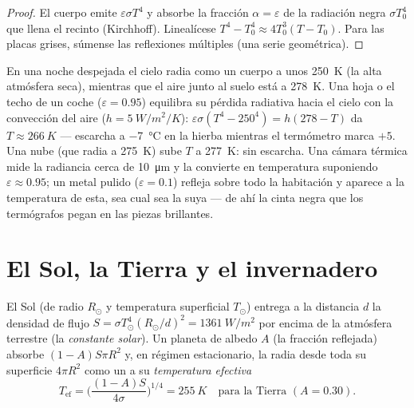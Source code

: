 \begin{proof}
El cuerpo emite $\varepsilon\sigma T^4$ y absorbe la fracción $\alpha =
\varepsilon$ de la radiación negra $\sigma T_0^4$ que llena el recinto
(Kirchhoff). Linealícese $T^4 - T_0^4 \approx 4T_0^3(T - T_0)$. Para las
placas grises, súmense las reflexiones múltiples (una serie geométrica).
\end{proof}

\begin{example}\label{ex:b2:thermal-radiation:frost}
En una noche despejada el cielo radia como un cuerpo a unos \qty{250}{K}
(la alta atmósfera seca), mientras que el aire junto al suelo está a
\qty{278}{K}. Una hoja o el techo de un coche ($\varepsilon = 0.95$) equilibra su
pérdida radiativa hacia el cielo con la convección del aire ($h =
\qty{5}{W/m^2/K}$): $\varepsilon\sigma(T^4 - 250^4) = h(278 - T)$ da $T
\approx \qty{266}{K}$ --- escarcha a \qty{-7}{\celsius} en la hierba mientras
el termómetro marca $+5$. Una nube (que radia a \qty{275}{K}) sube $T$
a \qty{277}{K}: sin escarcha. Una cámara térmica mide la radiancia cerca de
\qty{10}{\micro m} y la convierte en temperatura suponiendo
$\varepsilon \approx 0.95$; un metal pulido ($\varepsilon = 0.1$) refleja
sobre todo la habitación y aparece a la temperatura de esta, sea cual sea la
suya --- de ahí la cinta negra que los termógrafos pegan en las piezas brillantes.
\end{example}

\section{El Sol, la Tierra y el invernadero}

\begin{proposition}\label{prop:b2:thermal-radiation:earth}
El Sol (de radio $R_\odot$ y temperatura superficial $T_\odot$) entrega a la
distancia $d$ la densidad de flujo $S = \sigma T_\odot^4 (R_\odot/d)^2 =
\qty{1361}{W/m^2}$ por encima de la atmósfera terrestre (la \emph{constante
solar}). Un planeta de albedo $A$ (la fracción
reflejada) absorbe $(1 - A)S\pi R^2$ y, en régimen estacionario, la radia
desde toda su superficie $4\pi R^2$ como un  a su \emph{temperatura
efectiva}
\[
T_{\text{ef}} = \Big(\frac{(1 - A)S}{4\sigma}\Big)^{1/4} = \qty{255}{K}
\quad\text{para la Tierra } (A = 0.30) .
\]
\end{proposition}

